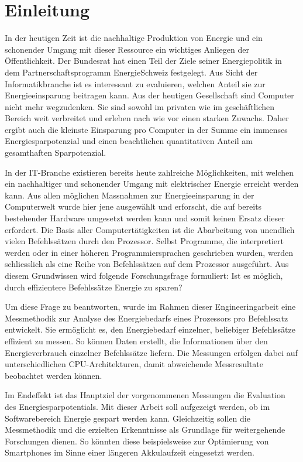 \chapter{Einleitung}


In der heutigen Zeit ist die nachhaltige Produktion von Energie und ein schonender Umgang mit dieser Ressource ein wichtiges Anliegen der Öffentlichkeit. Der Bundesrat hat einen Teil der Ziele seiner Energiepolitik in dem Partnerschaftsprogramm EnergieSchweiz festgelegt. Aus Sicht der Informatikbranche ist es interessant zu evaluieren, welchen Anteil sie zur Energieeinsparung beitragen kann. Aus der heutigen Gesellschaft sind Computer nicht mehr wegzudenken. Sie sind sowohl im privaten wie im geschäftlichen Bereich weit verbreitet und erleben nach wie vor einen starken Zuwachs. Daher ergibt auch die kleinste Einsparung pro Computer in der Summe ein immenses Energiesparpotenzial und einen beachtlichen quantitativen Anteil am gesamthaften Sparpotenzial. 
\par
In der IT-Branche existieren bereits heute zahlreiche Möglichkeiten, mit welchen ein nachhaltiger und schonender Umgang mit elektrischer Energie erreicht werden kann. Aus allen möglichen Massnahmen zur Energieeinsparung in der Computerwelt wurde hier jene ausgewählt und erforscht, die auf bereits bestehender Hardware umgesetzt werden kann und somit keinen Ersatz dieser erfordert. Die Basis aller Computertätigkeiten ist die Abarbeitung von unendlich vielen Befehlssätzen durch den Prozessor. Selbst Programme, die interpretiert werden oder in einer höheren Programmiersprachen geschrieben wurden, werden schliesslich als eine Reihe von Befehlssätzen auf dem Prozessor ausgeführt. Aus diesem Grundwissen wird folgende Forschungsfrage formuliert: Ist es möglich, durch effizientere Befehlssätze Energie zu sparen?
\par
Um diese Frage zu beantworten, wurde im Rahmen dieser Engineeringarbeit eine Messmethodik zur Analyse des Energiebedarfs eines Prozessors pro Befehlssatz entwickelt. Sie ermöglicht es, den Energiebedarf einzelner, beliebiger Befehlssätze effizient zu messen. So können Daten erstellt, die Informationen über den Energieverbrauch einzelner Befehlssätze liefern. Die Messungen erfolgen dabei auf unterschiedlichen CPU-Architekturen, damit abweichende Messresultate beobachtet werden können.
\par
Im Endeffekt ist das Hauptziel der vorgenommenen Messungen die Evaluation des Energiesparpotentials. Mit dieser Arbeit soll aufgezeigt werden, ob im Softwarebereich Energie gespart werden kann. Gleichzeitig sollen die Messmethodik und die erzielten Erkenntnisse als Grundlage für weitergehende Forschungen dienen. So könnten diese beispielsweise zur Optimierung von Smartphones im Sinne einer längeren Akkulaufzeit eingesetzt werden.
